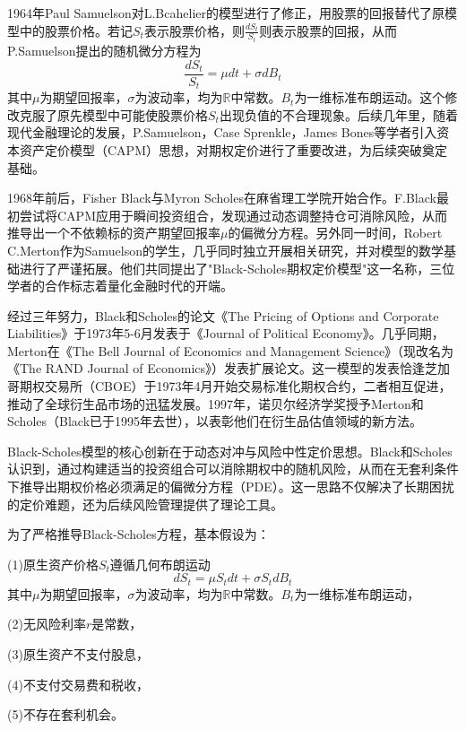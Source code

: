 \documentclass[UTF8，12pt]{ctexart}
\numberwithin{equation}{section}
\begin{document}
1964年Paul Samuelson对L.Bcahelier的模型进行了修正，用股票的回报替代了原模型中的股票价格。若记$S_t$表示股票价格，则$\frac{dS_t}{S_t}$则表示股票的回报，从而P.Samuelson提出的随机微分方程为
\begin{equation}
	\frac{dS_t}{S_t}=\mu dt+\sigma dB_t
\end{equation}
其中$\mu$为期望回报率，$\sigma$为波动率，均为$\mathbb{R}$中常数。$B_t$为一维标准布朗运动。这个修改克服了原先模型中可能使股票价格$S_t$出现负值的不合理现象。后续几年里，随着现代金融理论的发展，P.Samuelson，Case Sprenkle，James Bones等学者引入资本资产定价模型（CAPM）思想，对期权定价进行了重要改进，为后续突破奠定基础。

1968年前后，Fisher Black与Myron Scholes在麻省理工学院开始合作。F.Black最初尝试将CAPM应用于瞬间投资组合，发现通过动态调整持仓可消除风险，从而推导出一个不依赖标的资产期望回报率$\mu$的偏微分方程。另外同一时间，Robert C.Merton作为Samuelson的学生，几乎同时独立开展相关研究，并对模型的数学基础进行了严谨拓展。他们共同提出了"Black-Scholes期权定价模型"这一名称，三位学者的合作标志着量化金融时代的开端。

经过三年努力，Black和Scholes的论文《The Pricing of Options and Corporate Liabilities》于1973年5-6月发表于《Journal of Political Economy》。几乎同期，Merton在《The Bell Journal of Economics and Management Science》（现改名为《The RAND Journal of Economics》）发表扩展论文。这一模型的发表恰逢芝加哥期权交易所（CBOE）于1973年4月开始交易标准化期权合约，二者相互促进，推动了全球衍生品市场的迅猛发展。1997年，诺贝尔经济学奖授予Merton和Scholes（Black已于1995年去世），以表彰他们在衍生品估值领域的新方法。

Black-Scholes模型的核心创新在于动态对冲与风险中性定价思想。Black和Scholes认识到，通过构建适当的投资组合可以消除期权中的随机风险，从而在无套利条件下推导出期权价格必须满足的偏微分方程（PDE）。这一思路不仅解决了长期困扰的定价难题，还为后续风险管理提供了理论工具。

为了严格推导Black-Scholes方程，基本假设为：

\noindent(1)原生资产价格$S_t$遵循几何布朗运动
\begin{equation}
	dS_t=\mu S_tdt+\sigma S_tdB_t
\end{equation}
其中$\mu$为期望回报率，$\sigma$为波动率，均为$\mathbb{R}$中常数。$B_t$为一维标准布朗运动，

\noindent(2)无风险利率$r$是常数，

\noindent(3)原生资产不支付股息，

\noindent(4)不支付交易费和税收，

\noindent(5)不存在套利机会。
\end{document}
